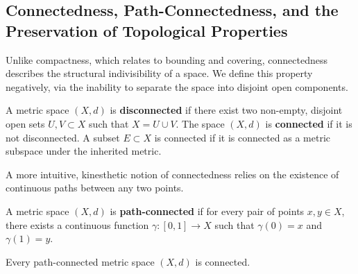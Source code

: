 \subsection{Connectedness, Path-Connectedness, and the Preservation of Topological Properties}

Unlike compactness, which relates to bounding and covering, connectedness describes the structural indivisibility of a space. We define this property negatively, via the inability to separate the space into disjoint open components.

\begin{definition}
A metric space $(X, d)$ is \textbf{disconnected} if there exist two non-empty, disjoint open sets $U, V \subset X$ such that $X = U \cup V$. The space $(X, d)$ is \textbf{connected} if it is not disconnected. A subset $E \subset X$ is connected if it is connected as a metric subspace under the inherited metric.
\end{definition}

A more intuitive, kinesthetic notion of connectedness relies on the existence of continuous paths between any two points. 

\begin{definition}
A metric space $(X, d)$ is \textbf{path-connected} if for every pair of points $x, y \in X$, there exists a continuous function $\gamma: [0, 1] \to X$ such that $\gamma(0) = x$ and $\gamma(1) = y$.
\end{definition}

\begin{theorem}
Every path-connected metric space $(X, d)$ is connected.
\end{theorem}

